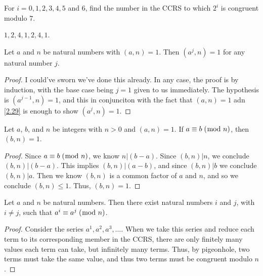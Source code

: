 \documentclass[../main.tex]{subfiles}
\begin{document}
\begin{ex} \label{4.1}
  For $i = 0, 1, 2, 3, 4, 5$ and $6$, find the number in the CCRS to which $2^i$ is congruent modulo $7$.
\end{ex}

$1, 2, 4, 1, 2, 4, 1$.



\begin{thm} \label{4.2}
  Let $a$ and $n$ be natural numbers with $(a, n) = 1$. Then $(a^j, n) = 1$ for any natural number $j$.
\end{thm}

\begin{proof}
  I could've sworn we've done this already. In any case, the proof is by induction, with the base case being $j=1$ given to us immediately. The hypothesis is $(a^{j-1},n) = 1$, and this in conjunciton with the fact that $(a, n) = 1$ adn \ref{2.29} is enough to show $(a^j, n) = 1$.
\end{proof}



\begin{thm} \label{4.3}
  Let $a$, $b$, and $n$ be integers with $n > 0$ and $(a, n) = 1$. If $a \equiv b \; (\bmod \; n)$, then $(b, n) = 1$.
\end{thm}

\begin{proof}
  Since $a \equiv b \; (\bmod \; n)$, we know $n | (b - a)$. Since $(b, n) | n$, we conclude $(b, n) | (b-a)$. This implies $(b, n) | (a-b)$, and since $(b, n) | b$ we conclude $(b, n) | a$. Then we know $(b, n)$ is a common factor of $a$ and $n$, and so we conclude $(b, n) \leq 1$. Thus, $(b, n) = 1$.
\end{proof}



\begin{thm} \label{4.4}
  Let $a$ and $n$ be natural numbers. Then there exist natural numbers $i$ and $j$, with $i \neq j$, such that $a^i \equiv a^j \; (\bmod \; n)$.
\end{thm}

\begin{proof}
  Consider the series $a^1, a^2, a^3, \ldots$. When we take this series and reduce each term to its corresponding member in the CCRS, there are only finitely many values each term can take, but infinitely many terms. Thus, by pigeonhole, two terms must take the same value, and thus two terms must be congruent modulo $n$.
\end{proof}
\end{document}
